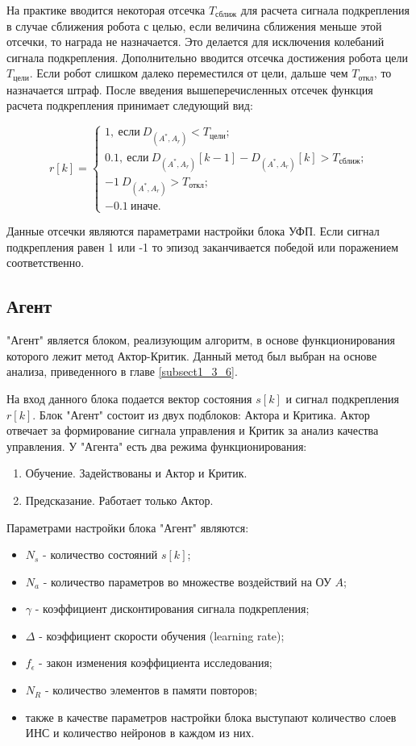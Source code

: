 На практике вводится некоторая отсечка $ T_{\text{сближ}} $ для расчета сигнала подкрепления в случае сближения робота с целью, если величина сближения меньше этой отсечки, то награда не назначается. Это делается для исключения колебаний сигнала подкрепления. Дополнительно вводится отсечка достижения робота цели $ T_{\text{цели}} $. Если робот слишком далеко переместился от цели, дальше чем $ T_{\text{откл}} $, то назначается штраф. После введения вышеперечисленных отсечек функция расчета подкрепления принимает следующий вид:

$$
r[k] = 
\begin{cases}
1, \: \text{если} \: D_{(A^*, A_r)} < T_{\text{цели}}; \\
0.1, \: \text{если} \: D_{(A^*, A_r)}[k-1] - D_{(A^*, A_r)}[k] > T_{\text{сближ}}; \\
-1 \: D_{(A^*, A_r)} > T_{\text{откл}};\\
-0.1 \: \text{иначе}.
\end{cases}
$$

\noindent Данные отсечки являются параметрами настройки блока УФП. Если сигнал подкрепления равен 1 или -1 то эпизод заканчивается победой или поражением соответственно.

\subsection{Агент} \label{subsect2_2_4}
"Агент" является блоком, реализующим алгоритм, в основе функционирования которого лежит метод Актор-Критик. Данный метод был выбран на основе анализа, приведенного в главе \ref{subsect1_3_6}.

На вход данного блока подается вектор состояния $s[k]$ и сигнал подкрепления $r[k]$. Блок "Агент" состоит из двух подблоков: Актора и Критика. Актор отвечает за формирование сигнала управления и Критик за анализ качества управления. У "Агента" есть два режима функционирования:
\begin{enumerate}
	\item Обучение. Задействованы и Актор и Критик.
	\item Предсказание. Работает только Актор.
\end{enumerate} 

Параметрами настройки блока "Агент" являются:
\begin{itemize}
	\item $ N_s $ - количество состояний $s[k]$;
	\item $ N_a $ - количество параметров во множестве воздействий на ОУ $ A $;
	\item $ \gamma $ - коэффициент дисконтирования сигнала подкрепления;
	\item $ \Delta $ - коэффициент скорости обучения (learning rate);
	\item $ f_{\epsilon} $ - закон изменения коэффициента исследования;
	\item $ N_R $ - количество элементов в памяти повторов;
	\item также в качестве параметров настройки блока выступают количество слоев ИНС и количество нейронов в каждом из них.
\end{itemize}

